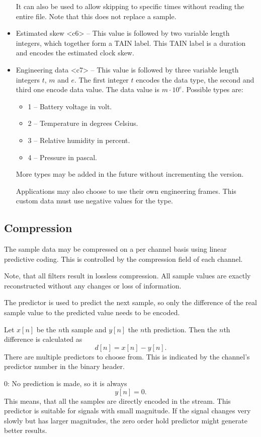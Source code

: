 \documentclass[DIV=10]{scrartcl}
\begin{document}
\begin{itemize}
  It can also be used to allow skipping to specific times without reading the entire file.
  Note that this does not replace a sample.
  \item Estimated skew <c6> – This value is followed by two variable length integers, which together form a TAIN label.
  This TAIN label is a duration and encodes the estimated clock skew.
  \item Engineering data <c7> – This value is followed by three variable length integers \(t\), \(m\) and \(e\).
  The first integer \(t\) encodes the data type, the second and third one encode data value.
  The data value is \(m \cdot 10^e\).
  Possible types are:
  \begin{itemize}
    \item 1 – Battery voltage in volt.
    \item 2 – Temperature in degrees Celsius.
    \item 3 – Relative humidity in percent.
    \item 4 – Pressure in pascal.
  \end{itemize}
  More types may be added in the future without incrementing the version.

  Applications may also choose to use their own engineering frames.
  This custom data must use negative values for the type.
\end{itemize}

\subsection{Compression}
\label{compression}

The sample data may be compressed on a per channel basis using linear predictive coding.
This is controlled by the compression field of each channel.

Note, that all filters result in lossless compression.
All sample values are exactly reconstructed without any changes or loss of information.

The predictor is used to predict the next sample, so only the difference of the real sample value to the predicted value needs to be encoded.

Let \(x[n]\) be the \(n\)th sample and \(y[n]\) the \(n\)th prediction.
Then the \(n\)th difference is calculated as
\[
  d[n] = x[n] - y[n].
\]
There are multiple predictors to choose from.
This is indicated by the channel’s predictor number in the binary header.

0: No prediction is made, so it is always
\[
  y[n] = 0.
\]
This means, that all the samples are directly encoded in the stream.
This predictor is suitable for signals with small magnitude.
If the signal changes very slowly but has larger magnitudes, the zero order hold predictor might generate better results.
\end{document}
